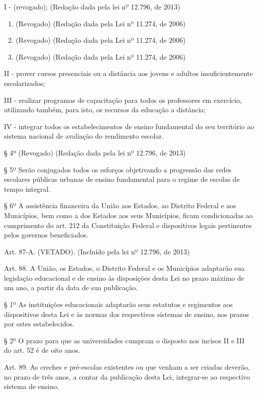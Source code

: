 \documentclass[
]{book}
\begin{document}
I - (revogado); (Redação dada pela lei nº 12.796, de 2013)

\begin{enumerate}
\def\labelenumi{\alph{enumi})}
\item
  (Revogado) (Redação dada pela Lei nº 11.274, de 2006)
\item
  (Revogado) (Redação dada pela Lei nº 11.274, de 2006)
\item
  (Revogado) (Redação dada pela Lei nº 11.274, de 2006)
\end{enumerate}

II - prover cursos presenciais ou a distância aos jovens e adultos insuficientemente escolarizados;

III - realizar programas de capacitação para todos os professores em exercício, utilizando também, para isto, os recursos da educação a distância;

IV - integrar todos os estabelecimentos de ensino fundamental do seu território ao sistema nacional de avaliação do rendimento escolar.

§ 4º (Revogado) (Redação dada pela lei nº 12.796, de 2013)

§ 5º Serão conjugados todos os esforços objetivando a progressão das redes escolares públicas urbanas de ensino fundamental para o regime de escolas de tempo integral.

§ 6º A assistência financeira da União aos Estados, ao Distrito Federal e aos Municípios, bem como a dos Estados aos seus Municípios, ficam condicionadas ao cumprimento do art. 212 da Constituição Federal e dispositivos legais pertinentes pelos governos beneficiados.

Art. 87-A. (VETADO). (Incluído pela lei nº 12.796, de 2013)

Art. 88. A União, os Estados, o Distrito Federal e os Municípios adaptarão sua legislação educacional e de ensino às disposições desta Lei no prazo máximo de um ano, a partir da data de sua publicação.

§ 1º As instituições educacionais adaptarão seus estatutos e regimentos aos dispositivos desta Lei e às normas dos respectivos sistemas de ensino, nos prazos por estes estabelecidos.

§ 2º O prazo para que as universidades cumpram o disposto nos incisos II e III do art. 52 é de oito anos.

Art. 89. As creches e pré-escolas existentes ou que venham a ser criadas deverão, no prazo de três anos, a contar da publicação desta Lei, integrar-se ao respectivo sistema de ensino.
\end{document}
